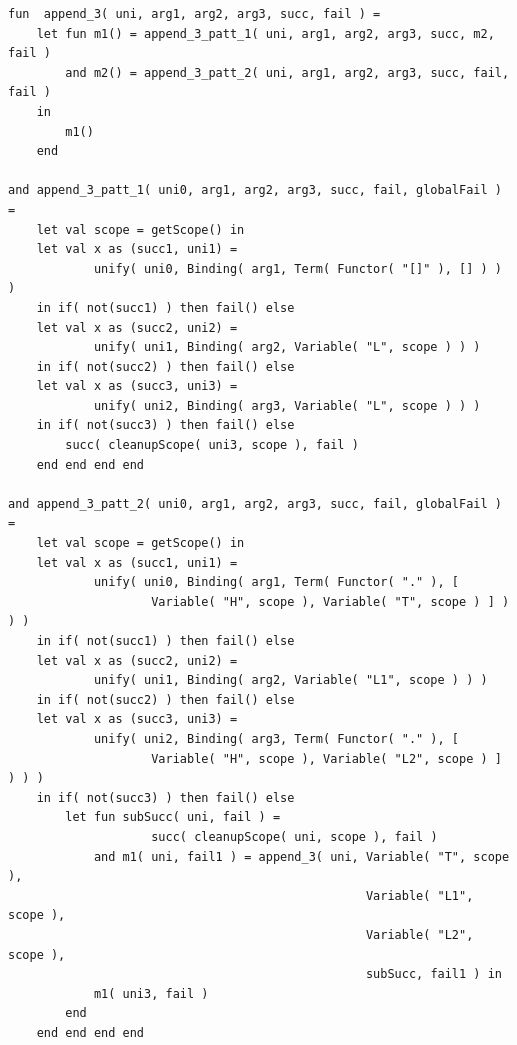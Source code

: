 \documentclass[12pt]{article}
\begin{document}
\begin{verbatim}
fun  append_3( uni, arg1, arg2, arg3, succ, fail ) = 
    let fun m1() = append_3_patt_1( uni, arg1, arg2, arg3, succ, m2, fail )
        and m2() = append_3_patt_2( uni, arg1, arg2, arg3, succ, fail, fail ) 
    in
        m1()
    end

and append_3_patt_1( uni0, arg1, arg2, arg3, succ, fail, globalFail ) = 
    let val scope = getScope() in
    let val x as (succ1, uni1) = 
            unify( uni0, Binding( arg1, Term( Functor( "[]" ), [] ) ) )
    in if( not(succ1) ) then fail() else
    let val x as (succ2, uni2) = 
            unify( uni1, Binding( arg2, Variable( "L", scope ) ) )
    in if( not(succ2) ) then fail() else
    let val x as (succ3, uni3) = 
            unify( uni2, Binding( arg3, Variable( "L", scope ) ) )
    in if( not(succ3) ) then fail() else
        succ( cleanupScope( uni3, scope ), fail )
    end end end end

and append_3_patt_2( uni0, arg1, arg2, arg3, succ, fail, globalFail ) = 
    let val scope = getScope() in
    let val x as (succ1, uni1) = 
            unify( uni0, Binding( arg1, Term( Functor( "." ), [ 
                    Variable( "H", scope ), Variable( "T", scope ) ] ) ) )
    in if( not(succ1) ) then fail() else
    let val x as (succ2, uni2) = 
            unify( uni1, Binding( arg2, Variable( "L1", scope ) ) )
    in if( not(succ2) ) then fail() else
    let val x as (succ3, uni3) = 
            unify( uni2, Binding( arg3, Term( Functor( "." ), [ 
                    Variable( "H", scope ), Variable( "L2", scope ) ] ) ) )
    in if( not(succ3) ) then fail() else
        let fun subSucc( uni, fail ) = 
                    succ( cleanupScope( uni, scope ), fail )
            and m1( uni, fail1 ) = append_3( uni, Variable( "T", scope ), 
                                                  Variable( "L1", scope ), 
                                                  Variable( "L2", scope ), 
                                                  subSucc, fail1 ) in
            m1( uni3, fail )
        end
    end end end end
\end{verbatim}
\end{document}
